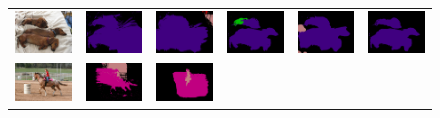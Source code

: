\begin{figure}[!htbp]
{\begin{tabular}{c c c c c c}
    \includegraphics[height=0.122\linewidth]{fig/val_crf_vis/img/2007_002852.jpg} &
    \includegraphics[height=0.122\linewidth]{fig/val_crf_vis/adaweak/2007_002852.png} &
    \includegraphics[height=0.122\linewidth]{fig/val_crf_vis/bbox/2007_002852.png} &
    \includegraphics[height=0.122\linewidth]{fig/val_crf_vis/bbox_crf/2007_002852.png} &
    \includegraphics[height=0.122\linewidth]{fig/val_crf_vis/strongweak/2007_002852.png} &
    \includegraphics[height=0.122\linewidth]{fig/val_crf_vis/cocomix/2007_002852.png} \\
    \includegraphics[height=0.11\linewidth]{fig/val_crf_vis/img/2007_003022.jpg} &
    \includegraphics[height=0.11\linewidth]{fig/val_crf_vis/adaweak/2007_003022.png} &
    \includegraphics[height=0.11\linewidth]{fig/val_crf_vis/bbox/2007_003022.png} &

\end{tabular}}
\end{figure}

